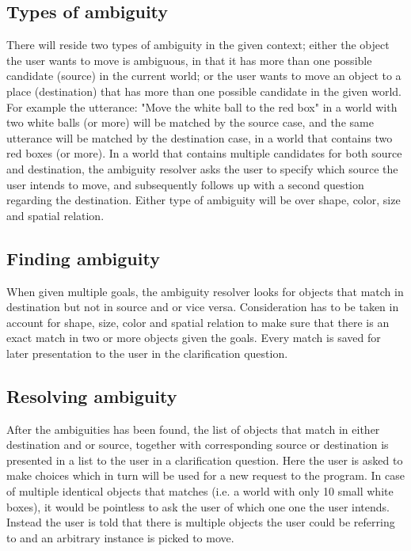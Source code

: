 \documentclass[11pt]{article}
\begin{document}
\subsection{Types of ambiguity}
There will reside two types of ambiguity in the given context; either the object the user wants to move is ambiguous, in that it has more than one possible candidate (source) in the current world; or the user wants to move an object to a place (destination) that has more than one possible candidate in the given world. For example the utterance: "Move the white ball to the red box"
in a world with two white balls (or more) will be matched by the source case, and the same utterance will be matched by the destination case, in a world that contains two red boxes (or more).
In a world that contains multiple candidates for both source and destination, the ambiguity resolver asks the user to specify which source the user intends to move, and subsequently follows up with a second question regarding the destination.
Either type of ambiguity will be over shape, color, size and spatial relation.

\subsection{Finding ambiguity}
When given multiple goals, the ambiguity resolver looks for objects that match in destination but not in source and or vice versa. Consideration has to be taken in account for shape, size, color and spatial relation to make sure that there is an exact match in two or more objects given the goals. Every match is saved for later presentation to the user in the clarification question.

\subsection{Resolving ambiguity}
After the ambiguities has been found, the list of  objects that match in either destination and or source, together with corresponding source or destination is presented in a list to the user in a clarification question. Here the user is asked to make choices which in turn will be used for a new request to the program.
In case of multiple identical objects that matches (i.e. a world with only 10 small white boxes), it would be pointless to ask the user of which one one the user intends. Instead the user is told that there is multiple objects the user could be referring to and an arbitrary instance is picked to move.
\end{document}
